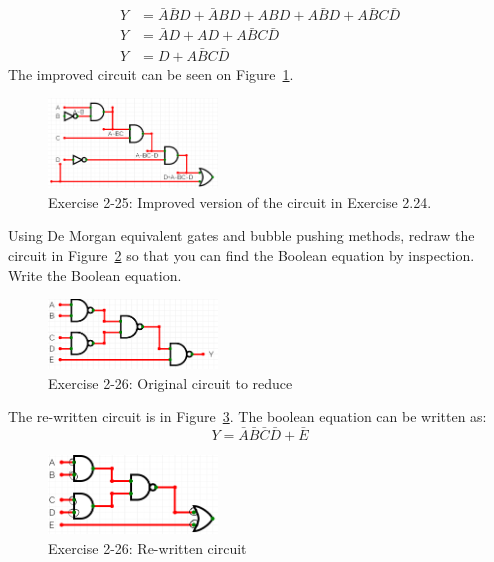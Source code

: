 \documentclass[12pt]{article}
\newenvironment{ex}[2][Exercise]{\begin{trivlist}
		\item[\hskip \labelsep {\bfseries #1}\hskip \labelsep {\bfseries #2.}]}{\end{trivlist}}
\newenvironment{sol}[1][Solution]{\begin{trivlist}
		\item[\hskip \labelsep {\bfseries #1:}]}{\end{trivlist}}
\begin{document}
\begin{sol}
\begin{align*}
		Y&=\bar{A}\bar{B}D+\bar{A}BD+ABD+A\bar{B}D+A\bar{B}C\bar{D}\\
		Y&=\bar{A}D+AD+A\bar{B}C\bar{D}\\
		Y&=D+A\bar{B}C\bar{D}
	\end{align*}
	The improved circuit can be seen on Figure~\ref{02-25-circuit}.
	\begin{figure}
		\centering
		\includegraphics[width=0.4\textwidth]{02-25-improved-circuit}
		\caption{Exercise 2-25: Improved version of the circuit in Exercise 2.24.}
		\label{02-25-circuit}
	\end{figure}
\end{sol}

\begin{ex}{2.26}
	Using De Morgan equivalent gates and bubble pushing methods, redraw
	the circuit in Figure~\ref{02-26-circuit-original} so that you can
	find the Boolean equation by inspection. Write the Boolean equation.
	\begin{figure}
		\centering
		\includegraphics[width=0.4\textwidth]{02-26-circuit-original}
		\caption{Exercise 2-26: Original circuit to reduce}
		\label{02-26-circuit-original}
	\end{figure}
\end{ex}

\begin{sol}
	The re-written circuit is in Figure~\ref{02-26-circuit-demorgan-equivalent}.
	The boolean equation can be written as:
	\[
	Y=\bar{A}\bar{B}\bar{C}\bar{D}+\bar{E}
	\]
	\begin{figure}
		\centering
		\includegraphics[width=0.4\textwidth]{02-26-circuit-demorgan-equivalent}
		\caption{Exercise 2-26: Re-written circuit}
		\label{02-26-circuit-demorgan-equivalent}
	\end{figure}
\end{sol}
\end{document}
